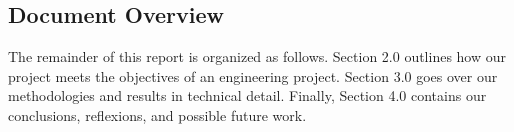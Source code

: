 \subsection{Document Overview}\label{subsec:document-overview}
The remainder of this report is organized as follows.
Section 2.0 outlines how our project meets the objectives of an engineering project.
Section 3.0 goes over our methodologies and results in technical detail.
Finally, Section 4.0 contains our conclusions, reflexions, and possible future work.
